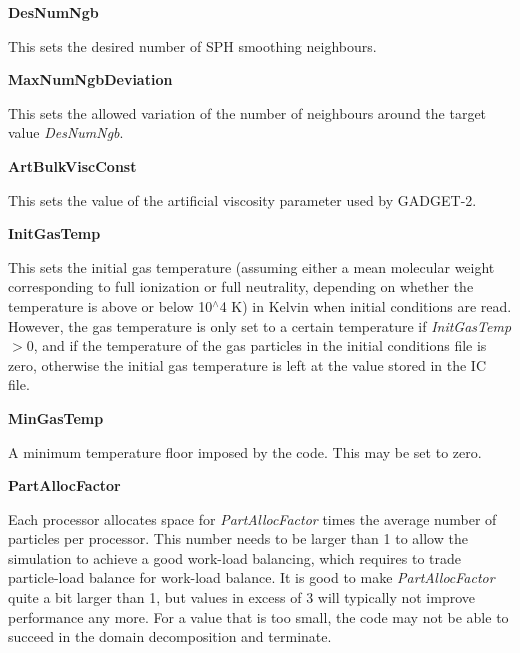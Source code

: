 \begin{DoxyItemize}
\item {\bfseries \-Des\-Num\-Ngb} \par
 \-This sets the desired number of \-S\-P\-H smoothing neighbours.
\end{DoxyItemize}


\begin{DoxyItemize}
\item {\bfseries \-Max\-Num\-Ngb\-Deviation} \par
 \-This sets the allowed variation of the number of neighbours around the target value {\itshape \-Des\-Num\-Ngb\/}.
\end{DoxyItemize}


\begin{DoxyItemize}
\item {\bfseries \-Art\-Bulk\-Visc\-Const} \par
 \-This sets the value of the artificial viscosity parameter used by \-G\-A\-D\-G\-E\-T-\/2.
\end{DoxyItemize}


\begin{DoxyItemize}
\item {\bfseries \-Init\-Gas\-Temp} \par
 \-This sets the initial gas temperature (assuming either a mean molecular weight corresponding to full ionization or full neutrality, depending on whether the temperature is above or below 10$^\wedge$4 \-K) in \-Kelvin when initial conditions are read. \-However, the gas temperature is only set to a certain temperature if {\itshape \-Init\-Gas\-Temp\/}$>$0, and if the temperature of the gas particles in the initial conditions file is zero, otherwise the initial gas temperature is left at the value stored in the \-I\-C file.
\end{DoxyItemize}


\begin{DoxyItemize}
\item {\bfseries \-Min\-Gas\-Temp} \par
 \-A minimum temperature floor imposed by the code. \-This may be set to zero.
\end{DoxyItemize}


\begin{DoxyItemize}
\item {\bfseries \-Part\-Alloc\-Factor} \par
 \-Each processor allocates space for {\itshape \-Part\-Alloc\-Factor\/} times the average number of particles per processor. \-This number needs to be larger than 1 to allow the simulation to achieve a good work-\/load balancing, which requires to trade particle-\/load balance for work-\/load balance. \-It is good to make {\itshape \-Part\-Alloc\-Factor\/} quite a bit larger than 1, but values in excess of 3 will typically not improve performance any more. \-For a value that is too small, the code may not be able to succeed in the domain decomposition and terminate.
\end{DoxyItemize}


